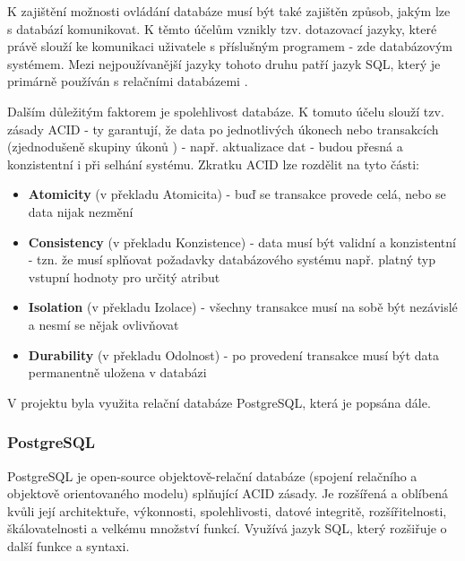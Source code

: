 	K zajištění možnosti ovládání databáze musí být také zajištěn způsob, jakým lze s databází komunikovat. K těmto účelům vznikly tzv. dotazovací jazyky, které právě slouží ke komunikaci uživatele s příslušným programem \cite{DotazJazyk} - zde databázovým systémem. Mezi nejpoužívanější jazyky tohoto druhu patří jazyk SQL, který je primárně používán s relačními databázemi \cite{SQL}.
	
	Dalším důležitým faktorem je spolehlivost databáze. K tomuto účelu slouží tzv. zásady ACID - ty garantují, že data po jednotlivých úkonech nebo transakcích (zjednodušeně skupiny úkonů \cite{Transakce}) - např. aktualizace dat - budou přesná a konzistentní i při selhání systému. Zkratku ACID lze rozdělit na tyto části:
	
	\begin{itemize}
		\item \textbf{Atomicity} (v překladu Atomicita) - buď se transakce provede celá, nebo se data nijak nezmění
		\item \textbf{Consistency} (v překladu Konzistence) - data musí být validní a konzistentní - tzn. že musí splňovat požadavky databázového systému např. platný typ vstupní hodnoty pro určitý atribut
		\item \textbf{Isolation} (v překladu Izolace) - všechny transakce musí na sobě být nezávislé a nesmí se nějak ovlivňovat
		\item \textbf{Durability} (v překladu Odolnost) - po provedení transakce musí být data permanentně uložena v databázi
		\cite{ACID}
	\end{itemize}
	
	V projektu byla využita relační databáze PostgreSQL, která je popsána dále.
	
		\subsubsection{PostgreSQL}
		PostgreSQL je open-source objektově-relační databáze (spojení relačního a objektově orientovaného modelu) splňující ACID zásady. Je rozšířená a oblíbená kvůli její architektuře, výkonnosti, spolehlivosti, datové integritě, rozšířitelnosti, škálovatelnosti a velkému množství funkcí. Využívá jazyk SQL, který rozšiřuje o další funkce a syntaxi. \cite{PostgreSQL}
